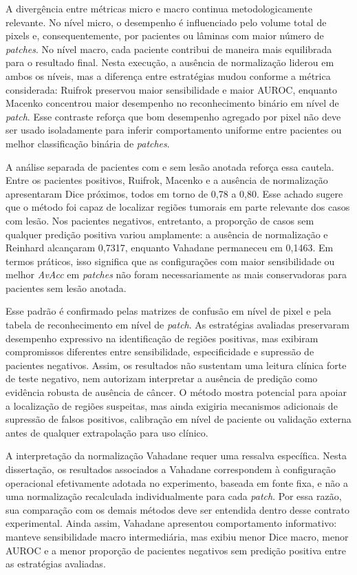 A divergência entre métricas micro e macro continua metodologicamente relevante. No nível micro, o desempenho é influenciado pelo volume total de pixels e, consequentemente, por pacientes ou lâminas com maior número de \textit{patches}. No nível macro, cada paciente contribui de maneira mais equilibrada para o resultado final. Nesta execução, a ausência de normalização liderou em ambos os níveis, mas a diferença entre estratégias mudou conforme a métrica considerada: Ruifrok preservou maior sensibilidade e maior AUROC, enquanto Macenko concentrou maior desempenho no reconhecimento binário em nível de \textit{patch}. Esse contraste reforça que bom desempenho agregado por pixel não deve ser usado isoladamente para inferir comportamento uniforme entre pacientes ou melhor classificação binária de \textit{patches}.

A análise separada de pacientes com e sem lesão anotada reforça essa cautela. Entre os pacientes positivos, Ruifrok, Macenko e a ausência de normalização apresentaram Dice próximos, todos em torno de 0{,}78 a 0{,}80. Esse achado sugere que o método foi capaz de localizar regiões tumorais em parte relevante dos casos com lesão. Nos pacientes negativos, entretanto, a proporção de casos sem qualquer predição positiva variou amplamente: a ausência de normalização e Reinhard alcançaram 0{,}7317, enquanto Vahadane permaneceu em 0{,}1463. Em termos práticos, isso significa que as configurações com maior sensibilidade ou melhor \textit{AvAcc} em \textit{patches} não foram necessariamente as mais conservadoras para pacientes sem lesão anotada.

Esse padrão é confirmado pelas matrizes de confusão em nível de pixel e pela tabela de reconhecimento em nível de \textit{patch}. As estratégias avaliadas preservaram desempenho expressivo na identificação de regiões positivas, mas exibiram compromissos diferentes entre sensibilidade, especificidade e supressão de pacientes negativos. Assim, os resultados não sustentam uma leitura clínica forte de teste negativo, nem autorizam interpretar a ausência de predição como evidência robusta de ausência de câncer. O método mostra potencial para apoiar a localização de regiões suspeitas, mas ainda exigiria mecanismos adicionais de supressão de falsos positivos, calibração em nível de paciente ou validação externa antes de qualquer extrapolação para uso clínico.

A interpretação da normalização Vahadane requer uma ressalva específica. Nesta dissertação, os resultados associados a Vahadane correspondem à configuração operacional efetivamente adotada no experimento, baseada em fonte fixa, e não a uma normalização recalculada individualmente para cada \textit{patch}. Por essa razão, sua comparação com os demais métodos deve ser entendida dentro desse contrato experimental. Ainda assim, Vahadane apresentou comportamento informativo: manteve sensibilidade macro intermediária, mas exibiu menor Dice macro, menor AUROC e a menor proporção de pacientes negativos sem predição positiva entre as estratégias avaliadas.

